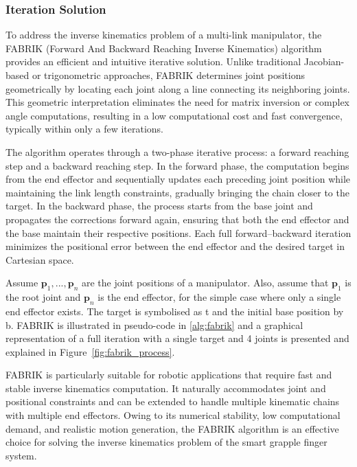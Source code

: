 \documentclass[a4paper,11pt]{article}
\begin{document}
\subsubsection{Iteration Solution} \label{sec:IK_iter}
To address the inverse kinematics problem of a multi-link manipulator, the \gls{FABRIK} (Forward And Backward Reaching Inverse Kinematics) algorithm \cite{Aristidou:2011:FABRIK} provides an efficient and intuitive iterative solution. Unlike traditional Jacobian-based or trigonometric approaches, \gls{FABRIK} determines joint positions geometrically by locating each joint along a line connecting its neighboring joints. This geometric interpretation eliminates the need for matrix inversion or complex angle computations, resulting in a low computational cost and fast convergence, typically within only a few iterations.

The algorithm operates through a two-phase iterative process: a forward reaching step and a backward reaching step. In the forward phase, the computation begins from the end effector and sequentially updates each preceding joint position while maintaining the link length constraints, gradually bringing the chain closer to the target. In the backward phase, the process starts from the base joint and propagates the corrections forward again, ensuring that both the end effector and the base maintain their respective positions. Each full forward–backward iteration minimizes the positional error between the end effector and the desired target in Cartesian space.

Assume $\mathbf{p}_1,...,\mathbf{p}_n$ are the joint positions of a manipulator. Also, assume that $\mathbf{p}_1$ is the root joint and $\mathbf{p}_n$ is the end effector, for the simple case where only a single end effector exists. The target is symbolised as t and the initial base
position by b. \gls{FABRIK} is illustrated in pseudo-code in \cref{alg:fabrik} and a graphical representation of a full iteration with a single target and 4 joints is presented and explained in Figure~\ref{fig:fabrik_process}.

\gls{FABRIK} is particularly suitable for robotic applications that require fast and stable inverse kinematics computation. It naturally accommodates joint and positional constraints and can be extended to handle multiple kinematic chains with multiple end effectors. Owing to its numerical stability, low computational demand, and realistic motion generation, the \gls{FABRIK} algorithm is an effective choice for solving the inverse kinematics problem of the smart grapple finger system. 
\end{document}
